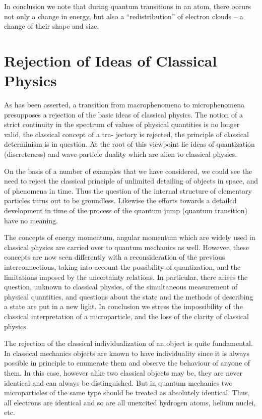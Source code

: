 \documentclass[a4paper,sfsidenotes,colorlinks=true]{tufte-book}
\numberwithin{equation}{section}
\numberwithin{figure}{section}
\begin{document}
In conclusion we note that during quantum transitions in an atom,
there occurs not only a change in energy, but also a ``redistribution''
of electron clouds -- a change of their shape and size.


\section{Rejection of Ideas of Classical Physics}
\label{sec-06}
As has  been asserted, a transition from
macrophenomena to microphenomena presupposes a rejection of the
basic ideas of classical physics. The notion of a strict continuity in
the spectrum of values of physical quantities is no longer valid,
the classical concept of a tra- jectory is rejected, the principle of
classical determinism is in question. At the root of this viewpoint
lie ideas of quantization (discreteness) and wave-particle duality
which are alien to classical physics.

On the basis of a number of examples that we have considered, we could
see the need to reject the classical principle of unlimited detailing
of objects in space, and of phenomena in time. Thus the question of
the internal structure of elementary particles turns out to be
groundless. Likewise the efforts towards a detailed development in
time of the process of the quantum jump (quantum transition) have no
meaning.


The concepts of energy momentum, angular momentum which are widely
used in classical physics are carried over to quantum mechanics as
well. However, these concepts are now seen differently with a
reconsideration of the previous interconnections, taking into account
the possibility of quantization, and the limitations imposed by the
uncertainty relations. In particular, there arises the question,
unknown to classical physics, of the simultaneous measurement of
physical quantities, and questions about the state and the methods of
describing a state are put in a new light. In conclusion we stress the
impossibility of the classical interpretation of a microparticle, and
the loss of the clarity of classical physics.


The rejection  of the classical
individualization of an object is quite fundamental. In classical
mechanics objects are known to have individuality since it is always
possible in principle to enumerate them and observe the behaviour of
anyone of them. In this case, however alike two classical objects
may be, they are never identical and can always be distinguished. But
in quantum mechanics two microparticles of the same type should be
treated as absolutely identical. Thus, all electrons are identical and
so are all unexcited hydrogen atoms, helium nuclei, etc.
\end{document}
